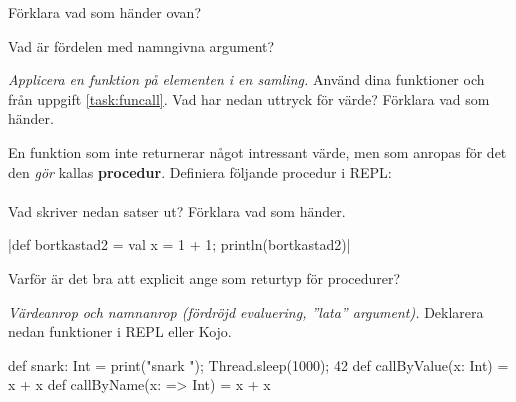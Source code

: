 \Subtask Förklara vad som händer ovan?

\Subtask\Pen Vad är fördelen med namngivna argument?



\Task \emph{Applicera en funktion på elementen i en samling.} Använd dina funktioner  och  från uppgift \ref{task:funcall}. Vad har nedan uttryck för värde? Förklara vad som händer.

\Subtask {}

\Subtask {}

\Subtask {}

\Subtask {}

\Subtask {}

\Subtask {}

\Subtask {}

\Subtask {}



\Task En funktion som inte returnerar något intressant värde, men som anropas för det den \emph{gör} kallas \textbf{procedur}. Definiera följande procedur i REPL: \\ 
 \\
Vad skriver nedan satser ut? Förklara vad som händer.

\Subtask {}

\Subtask {}

\Subtask {}

\Subtask {}

\Subtask {}

\Subtask \code|def bortkastad2 = {val x = 1 + 1}; println(bortkastad2)|

\Subtask\Pen Varför är det bra att explicit ange  som returtyp för procedurer?


\Task \emph{Värdeanrop och namnanrop (fördröjd evaluering, ''lata'' argument).} Deklarera nedan funktioner i REPL eller Kojo.

\begin{Code}
def snark: Int = {print("snark "); Thread.sleep(1000); 42}
def callByValue(x: Int) = x + x
def callByName(x: => Int) = x + x
\end{Code}

